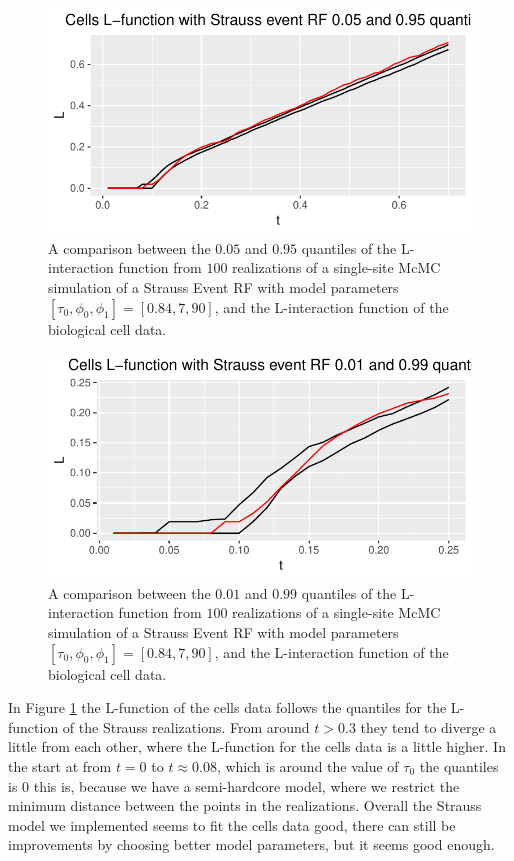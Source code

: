 \begin{figure}[H]
    \centering
    \includegraphics[scale=0.65]{figures/strauss_quant1.pdf}
    \caption{A comparison between the $0.05$ and $0.95$ quantiles of the L-interaction function from $100$ realizations of a single-site McMC simulation of a Strauss Event RF with model parameters $[\tau_0,\phi_0,\phi_1] = [0.84,7,90]$, and the L-interaction function of the biological cell data.}
    \label{fig:strauss_quant1}
\end{figure}

\begin{figure}[H]
    \centering
    \includegraphics[scale=0.65]{figures/strauss_quant2.pdf}
    \caption{A comparison between the $0.01$ and $0.99$ quantiles of the L-interaction function from $100$ realizations of a single-site McMC simulation of a Strauss Event RF with model parameters $[\tau_0,\phi_0,\phi_1] = [0.84,7,90]$, and the L-interaction function of the biological cell data.}
    \label{fig:strauss_quant2}
\end{figure}

In Figure \ref{fig:strauss_quant1} the L-function of the cells data follows the quantiles for the L-function of the Strauss realizations. From around $t>0.3$ they tend to diverge a little from each other, where the L-function for the cells data is a little higher. In the start at from $t=0$ to $t\approx 0.08$, which is around the value of $\tau_0$ the quantiles is $0$ this is, because we have a semi-hardcore model, where we restrict the minimum distance between the points in the realizations. Overall the Strauss model we implemented seems to fit the cells data good, there can still be improvements by choosing better model parameters, but it seems good enough.